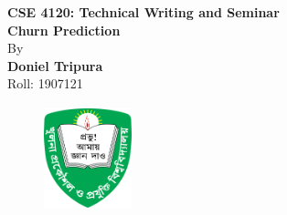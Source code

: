 \begin{titlepage}
    \begin{center}
    \setcounter{page}{0} %
    {\fontsize{14}{1.5}\selectfont \textbf{CSE 4120: Technical Writing and Seminar}}\\
    \vspace{12pt}
    {\fontsize{18}{1.5}\selectfont \textbf{Churn Prediction}}\\

    \vspace{12pt}
    \vspace{12pt}
    {\fontsize{14}{1.5}\selectfont By}\\
    \vspace{12pt}
    \vspace{12pt}
    \vspace{12pt}
    {\fontsize{14}{1.5}\selectfont \textbf{Doniel Tripura}}\\
    \vspace{12pt}
    {\fontsize{14}{1.5}\selectfont Roll: 1907121}\\
    \vspace{12pt}
    \vspace{12pt}
    \vspace{12pt}
    \vspace{12pt}
    \vspace{12pt}
    \vspace{12pt}
    \vspace{12pt}
    \vspace{12pt}
    \begin{figure}[htp!]
        \centering
        \includegraphics[height=1.2in, width=1in]{img/Logo_KUET.png}
    \end{figure}
    \vspace{12pt}
    \vspace{12pt}
    \vspace{12pt}

\end{center}
\end{titlepage}

